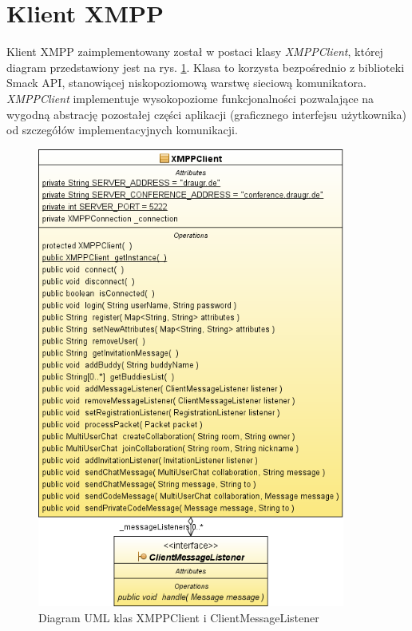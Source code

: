 \documentclass[polish,11pt,a4paper,twoside]{article}
\begin{document}

\section{Klient XMPP}

Klient XMPP zaimplementowany został w postaci klasy \emph{XMPPClient}, której diagram przedstawiony jest na rys. \ref{fig:uml_class_client}. Klasa to korzysta bezpośrednio z biblioteki Smack API, stanowiącej niskopoziomową warstwę sieciową komunikatora. \emph{XMPPClient} implementuje wysokopoziome funkcjonalności pozwalające na wygodną abstrację pozostałej części aplikacji (graficznego interfejsu użytkownika) od szczegółów implementacyjnych komunikacji.
\begin{figure}[!htb]
  \begin{center}
    \includegraphics[width=0.9\textwidth]{img/uml_class_client.png}
    \caption{Diagram UML klas XMPPClient i ClientMessageListener} \label{fig:uml_class_client} 
  \end{center}
\end{figure}
\end{document}
